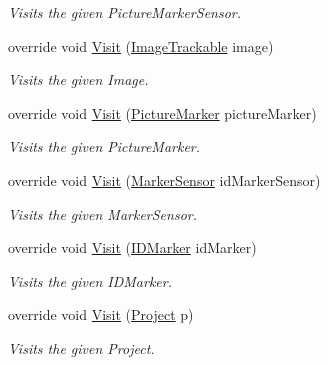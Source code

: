 \begin{DoxyCompactItemize}
\begin{DoxyCompactList}\small\item\em Visits the given Picture\-Marker\-Sensor. \end{DoxyCompactList}\item 
override void \hyperlink{class_a_rdev_kit_1_1_controller_1_1_project_controller_1_1_export_visitor_a6ba67134957206067b97c6ebba5a9c8a}{Visit} (\hyperlink{class_a_rdev_kit_1_1_model_1_1_project_1_1_image_trackable}{Image\-Trackable} image)
\begin{DoxyCompactList}\small\item\em Visits the given Image. \end{DoxyCompactList}\item 
override void \hyperlink{class_a_rdev_kit_1_1_controller_1_1_project_controller_1_1_export_visitor_a384b6fc84602fd29bedff296b083b3a0}{Visit} (\hyperlink{class_a_rdev_kit_1_1_model_1_1_project_1_1_picture_marker}{Picture\-Marker} picture\-Marker)
\begin{DoxyCompactList}\small\item\em Visits the given Picture\-Marker. \end{DoxyCompactList}\item 
override void \hyperlink{class_a_rdev_kit_1_1_controller_1_1_project_controller_1_1_export_visitor_a0e82718aa35b9bff19cd6db0b33f3d5c}{Visit} (\hyperlink{class_a_rdev_kit_1_1_model_1_1_project_1_1_marker_sensor}{Marker\-Sensor} id\-Marker\-Sensor)
\begin{DoxyCompactList}\small\item\em Visits the given Marker\-Sensor. \end{DoxyCompactList}\item 
override void \hyperlink{class_a_rdev_kit_1_1_controller_1_1_project_controller_1_1_export_visitor_aa4ad67b0cb408d8ec6aaf48906f1e5b3}{Visit} (\hyperlink{class_a_rdev_kit_1_1_model_1_1_project_1_1_i_d_marker}{I\-D\-Marker} id\-Marker)
\begin{DoxyCompactList}\small\item\em Visits the given I\-D\-Marker. \end{DoxyCompactList}\item 
override void \hyperlink{class_a_rdev_kit_1_1_controller_1_1_project_controller_1_1_export_visitor_ad58774c6778421b6bf85a6c70029a3d9}{Visit} (\hyperlink{class_a_rdev_kit_1_1_model_1_1_project_1_1_project}{Project} p)
\begin{DoxyCompactList}\small\item\em Visits the given Project. \end{DoxyCompactList}\end{DoxyCompactItemize}
